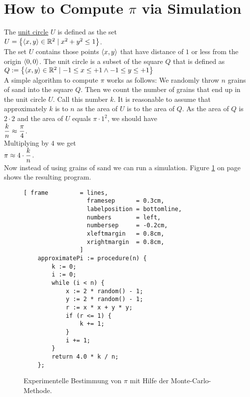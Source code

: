 \section{How to Compute $\pi$ via Simulation}
The \href{https://en.wikipedia.org/wiki/Unit_circle}{unit circle} $U$ is defined as the set 
\\[0.2cm]
\hspace*{1.3cm}
$U = \bigl\{ \pair(x,y) \in \mathbb{R}^2 \mid x^2 + y^2 \leq 1 \bigr\}$.
\\[0.2cm]
The set $U$ contains those points $\pair(x,y)$ that have distance of $1$ or less from the origin
$\pair(0,0)$.  The unit circle is a subset of the square $Q$ that is defined as 
\\[0.2cm]
\hspace*{1.3cm}
$Q := \bigl\{ \pair(x,y) \in \mathbb{R}^2 \mid -1 \leq x \leq +1 \wedge -1 \leq y \leq +1 \bigr\}$
\\[0.2cm]
A simple algorithm to compute $\pi$ works as follows:  We randomly throw $n$ grains of sand into the square $Q$.
Then we count the number of grains that end up in the unit circle $U$.  Call this number $k$.
It is reasonable to assume that approximately $k$ is to $n$ as the area of $U$ is to the area of $Q$.  As the area of $Q$ is
$2 \cdot 2$ and the area of $U$ equals $\pi \cdot 1^2$, we should have
\\[0.2cm]
\hspace*{1.3cm}
$\displaystyle\frac{k}{n} \approx \frac{\pi}{4}$.
\\[0.2cm]
Multiplying by $4$ we get
\\[0.2cm]
\hspace*{1.3cm}
$\displaystyle \pi \approx 4 \cdot \frac{k}{n}$.
\\[0.2cm]
Now instead of using grains of sand we can run a simulation.  Figure \ref{fig:monte-carlo.stlx} on page
\pageref{fig:monte-carlo.stlx} shows the resulting program.


\begin{figure}[!ht]
\centering
\begin{Verbatim}[ frame         = lines, 
                  framesep      = 0.3cm, 
                  labelposition = bottomline,
                  numbers       = left,
                  numbersep     = -0.2cm,
                  xleftmargin   = 0.8cm,
                  xrightmargin  = 0.8cm,
                ]
    approximatePi := procedure(n) {
        k := 0;  
        i := 0;
        while (i < n) {
            x := 2 * random() - 1;
            y := 2 * random() - 1;
            r := x * x + y * y;
            if (r <= 1) {
                k += 1;
            }
            i += 1;
        }
        return 4.0 * k / n;
    };
\end{Verbatim}
\vspace*{-0.3cm}
\caption{Experimentelle Bestimmung von $\pi$ mit Hilfe der Monte-Carlo-Methode.}
\label{fig:monte-carlo.stlx}
\end{figure}

